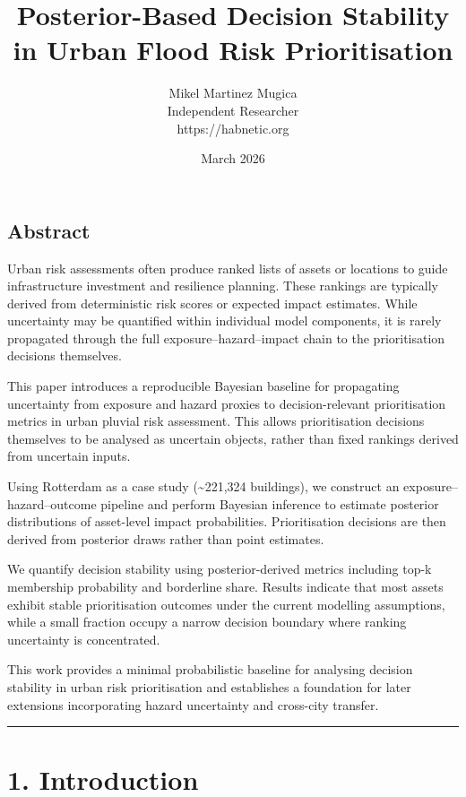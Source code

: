 \documentclass[
]{article}
\title{Posterior-Based Decision Stability in Urban Flood Risk
Prioritisation}
\author{Mikel Martinez Mugica\\
Independent Researcher\\
https://habnetic.org}
\date{March 2026}
\begin{document}
\maketitle

\subsection{Abstract}\label{abstract}

Urban risk assessments often produce ranked lists of assets or locations
to guide infrastructure investment and resilience planning. These
rankings are typically derived from deterministic risk scores or
expected impact estimates. While uncertainty may be quantified within
individual model components, it is rarely propagated through the full
exposure--hazard--impact chain to the prioritisation decisions
themselves.

This paper introduces a reproducible Bayesian baseline for propagating
uncertainty from exposure and hazard proxies to decision-relevant
prioritisation metrics in urban pluvial risk assessment. This allows
prioritisation decisions themselves to be analysed as uncertain objects,
rather than fixed rankings derived from uncertain inputs.

Using Rotterdam as a case study (\textasciitilde221,324 buildings), we
construct an exposure--hazard--outcome pipeline and perform Bayesian
inference to estimate posterior distributions of asset-level impact
probabilities. Prioritisation decisions are then derived from posterior
draws rather than point estimates.

We quantify decision stability using posterior-derived metrics including
top-k membership probability and borderline share. Results indicate that
most assets exhibit stable prioritisation outcomes under the current
modelling assumptions, while a small fraction occupy a narrow decision
boundary where ranking uncertainty is concentrated.

This work provides a minimal probabilistic baseline for analysing
decision stability in urban risk prioritisation and establishes a
foundation for later extensions incorporating hazard uncertainty and
cross-city transfer.

\begin{center}\rule{0.5\linewidth}{0.5pt}\end{center}

\section{1. Introduction}\label{introduction}
\end{document}
